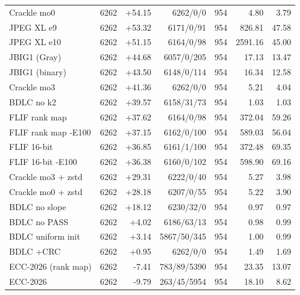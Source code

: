 \begin{table}[t]
\begin{tabular}{lrrrrrr}
Crackle mo0 & 6262 & +54.15 & 6262/0/0 & 954 & 4.80 & 3.79 \\
JPEG XL e9 & 6262 & +53.32 & 6171/0/91 & 954 & 826.81 & 47.58 \\
JPEG XL e10 & 6262 & +51.15 & 6164/0/98 & 954 & 2591.16 & 45.00 \\
JBIG1 (Gray) & 6262 & +44.68 & 6057/0/205 & 954 & 17.13 & 13.47 \\
JBIG1 (binary) & 6262 & +43.50 & 6148/0/114 & 954 & 16.34 & 12.58 \\
Crackle mo3 & 6262 & +41.36 & 6262/0/0 & 954 & 5.21 & 4.04 \\
BDLC no k2 & 6262 & +39.57 & 6158/31/73 & 954 & 1.03 & 1.03 \\
FLIF rank map & 6262 & +37.62 & 6164/0/98 & 954 & 372.04 & 59.26 \\
FLIF rank map -E100 & 6262 & +37.15 & 6162/0/100 & 954 & 589.03 & 56.04 \\
FLIF 16-bit & 6262 & +36.85 & 6161/1/100 & 954 & 372.48 & 69.35 \\
FLIF 16-bit -E100 & 6262 & +36.38 & 6160/0/102 & 954 & 598.90 & 69.16 \\
Crackle mo3 + zstd & 6262 & +29.31 & 6222/0/40 & 954 & 5.27 & 3.98 \\
Crackle mo0 + zstd & 6262 & +28.18 & 6207/0/55 & 954 & 5.22 & 3.90 \\
BDLC no slope & 6262 & +18.12 & 6230/32/0 & 954 & 0.97 & 0.97 \\
BDLC no PASS & 6262 & +4.02 & 6186/63/13 & 954 & 0.98 & 0.99 \\
BDLC uniform init & 6262 & +3.14 & 5867/50/345 & 954 & 1.00 & 0.99 \\
BDLC +CRC & 6262 & +0.95 & 6262/0/0 & 954 & 1.49 & 1.69 \\
ECC-2026 (rank map) & 6262 & -7.41 & 783/89/5390 & 954 & 23.35 & 13.07 \\
ECC-2026 & 6262 & -9.79 & 263/45/5954 & 954 & 18.10 & 8.62 \\
\hline
\end{tabular}
\end{table}
